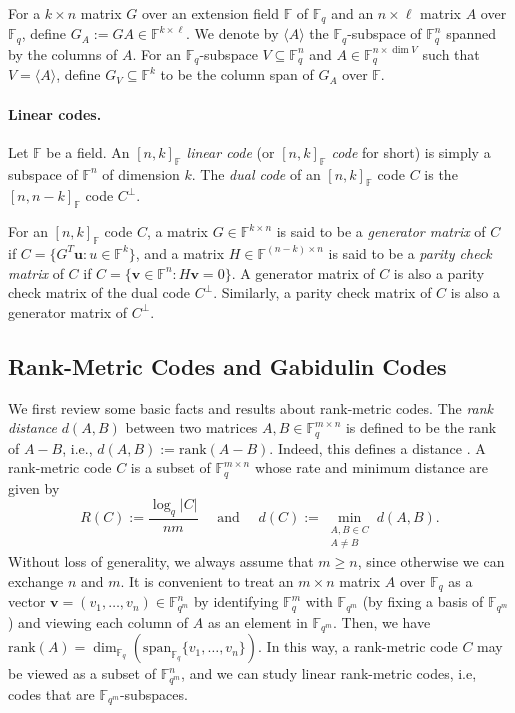 \documentclass[11pt]{article}
\theoremstyle{plain}
\theoremstyle{definition}
\theoremstyle{remark}
\newcommand{\F}{\mathbb{F}}
\newcommand{\spa}{\mathrm{span}}
\newcommand{\abs}[1]{\left| #1 \right|}
\newcommand{\bv}{\bm{v}}
\newcommand{\bu}{\bm{u}}
\newcommand{\rank}{\mathrm{rank}}
\begin{document}
For a $k\times n$ matrix $G$ over an extension field $\F$ of $\F_q$ and an $n\times \ell$ matrix $A$ over $\F_q$, define $G_A:=GA\in\F^{k\times \ell}$. We denote by $\langle A \rangle$ the $\F_q$-subspace of $\F_q^n$ spanned by the columns of $A$. 
For an $\F_q$-subspace $V\subseteq \F_q^n$ and $A\in \F_q^{n\times \dim V}$ such that $V=\langle A\rangle$, define $G_V\subseteq \F^k$ to be the column span of $G_A$ over $\F$.

\paragraph{Linear codes.} 
Let $\F$ be a field.
An \emph{$[n,k]_\F$ linear code} (or \emph{$[n,k]_\F$ code} for short) is simply a subspace of $\F^n$ of dimension $k$. 
The \emph{dual code} of an $[n,k]_\F$ code $C$ is the $[n,n-k]_\F$ code $C^\perp$.

For an $[n,k]_\F$ code $C$, a matrix $G\in \F^{k\times n}$ is said to be a \emph{generator matrix} of $C$ if $C=\{G^T \bu: u\in \F^k\}$, and a matrix $H\in \F^{(n-k)\times n}$ is said to be a \emph{parity check matrix} of $C$ if $C=\{\bv\in \F^n: H\bv=0\}$. A generator matrix of $C$ is also a parity check matrix of the dual code $C^\perp$. Similarly, a parity check matrix of $C$ is also a generator matrix of $C^\perp$.


\subsection{Rank-Metric Codes and Gabidulin Codes}
We first review some basic facts and results about rank-metric codes. The \emph{rank distance} $d(A,B)$ between two matrices $A, B\in \F_q^{m\times n}$ is defined to be the rank of $A-B$, i.e., $d(A,B):=\rank(A-B)$. Indeed, this defines a distance \cite{G85}. A rank-metric code $C$ is a subset of $\F_q^{m\times n}$
whose rate and minimum distance are given by
\[R(C) := \frac{\log_q\abs{C}}{nm}\quad \text{ and }\quad d(C) := \min_{\substack{A, B\in C\\ A\neq B}}d(A,B).\]
Without loss of generality, we always assume that $m\geq n$, since otherwise we can exchange $n$ and $m$. 
It is convenient to treat an $m\times n$ matrix $A$ over $\F_q$ as a vector $\bv=(v_1,\ldots,v_n)\in \F_{q^m}^n$ by identifying $\F_q^m$ with $\F_{q^m}$ (by fixing a basis of $\F_{q^m}$) and viewing each column of $A$ as an element in $\F_{q^m}$. Then, we have $\rank(A)=\dim_{\F_q}(\spa_{\F_q}\{v_1,\ldots,v_n\})$. In this way, a rank-metric code $C$ may be viewed as a subset of $\F_{q^m}^n$, and we can study linear rank-metric codes, i.e, codes that are $\F_{q^m}$-subspaces.
\end{document}
